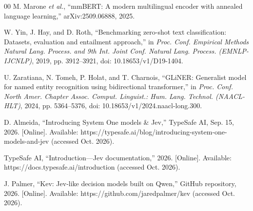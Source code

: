 \begin{thebibliography}{00}
 M. Marone \emph{et al.}, ``mmBERT: A modern multilingual encoder with annealed language learning,'' arXiv:2509.06888, 2025.

 W. Yin, J. Hay, and D. Roth, ``Benchmarking zero-shot text classification: Datasets, evaluation and entailment approach,'' in \emph{Proc. Conf. Empirical Methods Natural Lang. Process. and 9th Int. Joint Conf. Natural Lang. Process. (EMNLP-IJCNLP)}, 2019, pp. 3912--3921, doi: 10.18653/v1/D19-1404.

 U. Zaratiana, N. Tomeh, P. Holat, and T. Charnois, ``GLiNER: Generalist model for named entity recognition using bidirectional transformer,'' in \emph{Proc. Conf. North Amer. Chapter Assoc. Comput. Linguist.: Hum. Lang. Technol. (NAACL-HLT)}, 2024, pp. 5364--5376, doi: 10.18653/v1/2024.naacl-long.300.

 D. Almeida, ``Introducing System One models \& Jev,'' TypeSafe AI, Sep. 15, 2026. [Online]. Available: https://typesafe.ai/blog/introducing-system-one-models-and-jev (accessed Oct. 2026).

 TypeSafe AI, ``Introduction---Jev documentation,'' 2026. [Online]. Available: https://docs.typesafe.ai/introduction (accessed Oct. 2026).

 J. Palmer, ``Kev: Jev-like decision models built on Qwen,'' GitHub repository, 2026. [Online]. Available: https://github.com/jaredpalmer/kev (accessed Oct. 2026).


\end{thebibliography}
